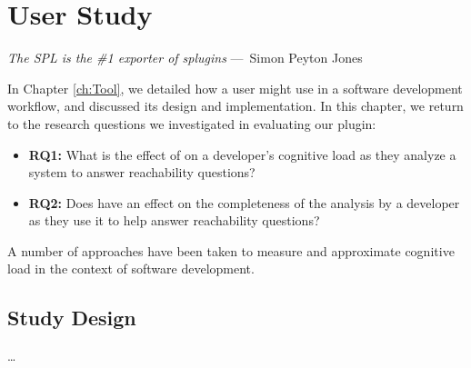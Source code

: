 
\chapter{User Study}
\label{ch:UserStudy}

\begin{epigraph}
    \emph{
      The SPL is the \#1 exporter of splugins
      } ---~Simon Peyton Jones
\end{epigraph}

\noindent In Chapter \ref{ch:Tool}, we detailed how a user might use
\toolname{} in a software development workflow, and discussed its design and 
implementation.
In this chapter, we return to the research questions we investigated in
evaluating our plugin:

\begin{itemize}
  \item[] \textbf{RQ1:} What is the effect of \toolname{} on a developer's 
  cognitive load as they analyze a system to answer reachability questions?
  \item[] \textbf{RQ2:} Does \toolname{} have an effect on the completeness
  of the analysis by a developer as they use it to help answer reachability 
  questions?
\end{itemize}

A number of approaches have been taken to measure and approximate cognitive
load in the context of software development.
\section{Study Design}
\label{sec:StudyDesign}

\dots

\endinput
